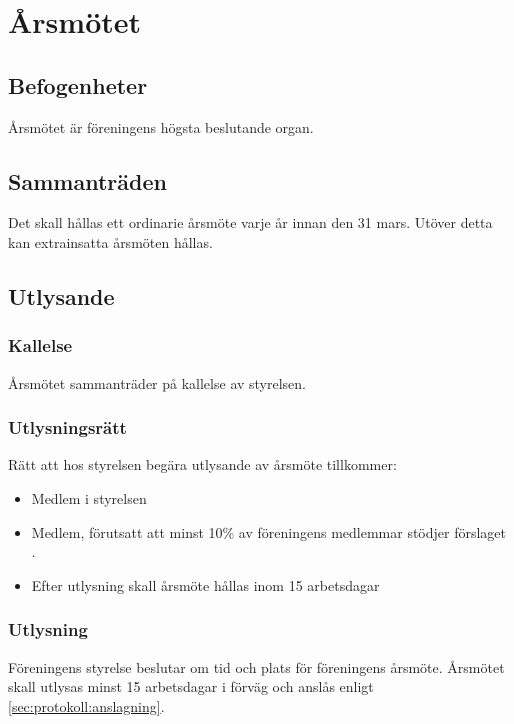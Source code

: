 \section{Årsmötet}
\subsection{Befogenheter} 
Årsmötet är föreningens högsta beslutande organ. 

\subsection{Sammanträden} 
Det skall hållas ett ordinarie årsmöte varje år innan den 31 mars. Utöver detta kan extrainsatta årsmöten hållas. 

\subsection{Utlysande}
\subsubsection{Kallelse} 
Årsmötet sammanträder på kallelse av styrelsen. 

\subsubsection{Utlysningsrätt}
Rätt att hos styrelsen begära utlysande av årsmöte tillkommer:
\begin{itemize}
	\item Medlem i styrelsen  
	\item Medlem, förutsatt att minst 10\% av föreningens medlemmar stödjer förslaget .
	\item Efter utlysning skall årsmöte hållas inom 15 arbetsdagar
\end{itemize}

\subsubsection{Utlysning}
Föreningens styrelse beslutar om tid och plats för föreningens årsmöte. Årsmötet
skall utlysas minst 15 arbetsdagar i förväg och anslås enligt \ref{sec:protokoll:anslagning}.

